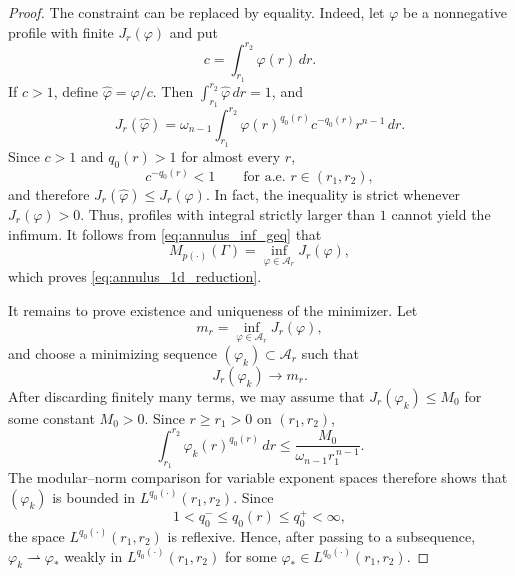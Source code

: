 \documentclass[12pt]{amsart}
\numberwithin{equation}{section}
\theoremstyle{plain}
\theoremstyle{definition}
\begin{document}
\begin{proof}
The constraint can be replaced by equality. Indeed, let $\varphi$ be
a nonnegative profile with finite $J_r(\varphi)$ and put
\begin{equation*}
c=\int_{r_1}^{r_2}\varphi(r)\,dr.
\end{equation*}
If $c>1$, define $\widehat\varphi=\varphi/c$. Then
$\int_{r_1}^{r_2}\widehat\varphi\,dr=1$, and
\begin{equation*}
J_r(\widehat\varphi)
=
\omega_{n-1}
\int_{r_1}^{r_2}
\varphi(r)^{q_0(r)}
c^{-q_0(r)}r^{n-1}\,dr.
\end{equation*}
Since $c>1$ and $q_0(r)>1$ for almost every $r$,
\begin{equation*}
c^{-q_0(r)}<1
\qquad\text{for a.e. }r\in(r_1,r_2),
\end{equation*}
and therefore $J_r(\widehat\varphi)\le J_r(\varphi).$
In fact, the inequality is strict whenever $J_r(\varphi)>0$.
Thus, profiles with integral strictly larger than $1$ cannot yield the
infimum. It follows from \eqref{eq:annulus_inf_geq} that
\begin{equation*}
M_{p(\cdot)}(\Gamma)
=
\inf_{\varphi\in\mathcal A_r}J_r(\varphi),
\end{equation*}
which proves \eqref{eq:annulus_1d_reduction}.

It remains to prove existence and uniqueness of the minimizer. Let
\begin{equation*}
m_r=\inf_{\varphi\in\mathcal A_r}J_r(\varphi),
\end{equation*}
and choose a minimizing sequence $(\varphi_k)\subset\mathcal A_r$ such
that
\begin{equation*}
J_r(\varphi_k)\longrightarrow m_r.
\end{equation*}
After discarding finitely many terms, we may assume that
$J_r(\varphi_k)\le M_0$ for some constant $M_0>0$. Since
$r\ge r_1>0$ on $(r_1,r_2)$,
\begin{equation*}
\int_{r_1}^{r_2}
\varphi_k(r)^{q_0(r)}\,dr
\le
\frac{M_0}{\omega_{n-1}r_1^{\,n-1}}.
\end{equation*}
The modular--norm comparison for variable exponent spaces therefore
shows that $(\varphi_k)$ is bounded in
$L^{q_0(\cdot)}(r_1,r_2)$. Since
\begin{equation*}
1<q_0^-\le q_0(r)\le q_0^+<\infty,
\end{equation*}
the space $L^{q_0(\cdot)}(r_1,r_2)$ is reflexive. Hence, after passing to
a subsequence, $\varphi_k\rightharpoonup\varphi_*$ weakly in $L^{q_0(\cdot)}(r_1,r_2)$
for some $\varphi_*\in L^{q_0(\cdot)}(r_1,r_2)$.


\end{proof}
\end{document}

